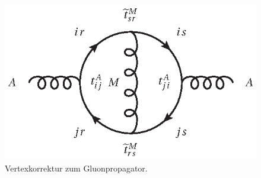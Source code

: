 \begin{figure}[h]
 \centering
 \includegraphics{abschnitte/n-schleifen/fig/QCDxdQCD1.eps}
 \caption{Vertexkorrektur zum Gluonpropagator.}\label{fig:n-schleifen:QCDxdQCD1}
\end{figure}
